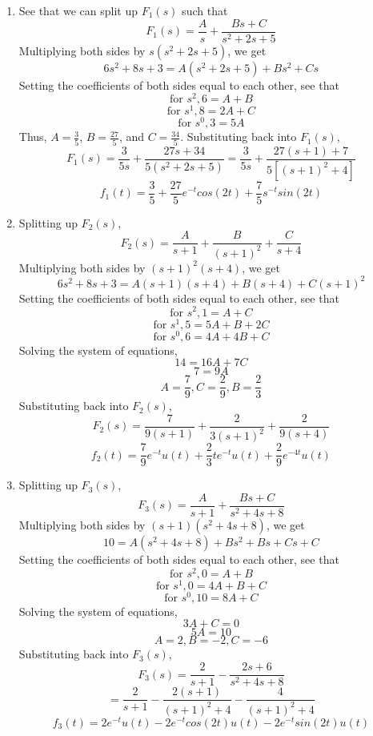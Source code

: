 \documentclass{article}
\begin{document}
\begin{enumerate}[label=(\alph*)]
    \item See that we can split up $F_1(s)$ such that $$F_1(s)=\frac{A}{s} + \frac{Bs+C}{s^2+2s+5}$$
        Multiplying both sides by $s(s^2+2s+5)$, we get
        $$6s^2+8s+3 = A(s^2+2s+5)+Bs^2+Cs$$
        Setting the coefficients of both sides equal to each other, see that
        $$\text{for } s^2, 6 = A + B$$
        $$\text{for } s^1, 8 = 2A + C$$
        $$\text{for } s^0, 3 = 5A$$
        Thus, $A=\frac{3}{5}$, $B=\frac{27}{5}$, and $C=\frac{34}{5}$.
        Substituting back into $F_1(s)$,
        $$F_1(s)=\frac{3}{5s} + \frac{27s+34}{5(s^2+2s+5)}=\frac{3}{5s}+\frac{27(s+1)+7}{5[(s+1)^2 + 4]}$$
        $$f_1(t)=\frac{3}{5}+\frac{27}{5}e^{-t}cos(2t)+\frac{7}{5}s^{-t}sin(2t)$$
    \item Splitting up $F_2(s)$, $$F_2(s)=\frac{A}{s+1}+\frac{B}{(s+1)^2}+\frac{C}{s+4}$$
        Multiplying both sides by $(s+1)^2 (s+4)$, we get
        $$6s^2+8s+3 = A(s+1)(s+4)+B(s+4)+C(s+1)^2$$
        Setting the coefficients of both sides equal to each other, see that
        $$\text{for } s^2, 1 = A+C$$
        $$\text{for } s^1, 5 = 5A+B+2C$$
        $$\text{for } s^0, 6 = 4A+4B+C$$
        Solving the system of equations, 
        $$14=16A+7C$$
        $$7=9A$$
        $$A=\frac{7}{9}, C=\frac{2}{9}, B = \frac{2}{3}$$
        Substituting back into $F_2(s)$,
        $$F_2(s)=\frac{7}{9(s+1)}+\frac{2}{3(s+1)^2}+\frac{2}{9(s+4)}$$
        $$f_2(t)=\frac{7}{9}e^{-t}u(t)+\frac{2}{3}te^{-t}u(t)+\frac{2}{9}e^{-4t}u(t)$$
    \item Splitting up $F_3(s)$, $$F_3(s)=\frac{A}{s+1}+\frac{Bs+C}{s^2+4s+8}$$
        Multiplying both sides by $(s+1)(s^2+4s+8)$, we get
        $$10 = A(s^2+4s+8)+Bs^2+Bs+Cs+C$$
        Setting the coefficients of both sides equal to each other, see that
        $$\text{for } s^2, 0 = A+B$$
        $$\text{for } s^1, 0 = 4A+B+C$$
        $$\text{for } s^0, 10 = 8A+C$$
        Solving the system of equations,
        $$3A+C=0$$
        $$5A=10$$
        $$A=2, B=-2, C=-6$$
        Substituting back into $F_3(s)$,
        $$F_3(s)=\frac{2}{s+1}-\frac{2s+6}{s^2+4s+8}$$
        $$=\frac{2}{s+1}-\frac{2(s+1)}{(s+1)^2+4}-\frac{4}{(s+1)^2 + 4}$$
        $$f_3(t)=2e^{-t}u(t)-2e^{-t}cos(2t)u(t) - 2e^{-t}sin(2t)u(t)$$
\end{enumerate}
\end{document}
